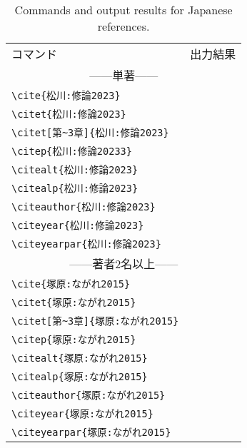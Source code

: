 \documentclass[a4paper,fleqn,uplatex,dvipdfmx]{jsarticle}
\begin{document}
\begin{table}[t]
    \centering
    \caption{Commands and output results for Japanese references.}
    \label{tab:Japanese}
    \begin{tabular}{ll}
        コマンド &出力結果 \\
        \multicolumn{2}{c}{------単著------} \\
        \verb|\cite{松川:修論2023}|            &\cite{松川:修論2023} \\
        \verb|\citet{松川:修論2023}|           &\citet{松川:修論2023} \\
        \verb|\citet[第~3章]{松川:修論2023}|           &\citet[第~3章]{松川:修論2023} \\
        \verb|\citep{松川:修論20233}|           &\citep{松川:修論2023} \\
        \verb|\citealt{松川:修論2023}|         &\citealt{松川:修論2023} \\
        \verb|\citealp{松川:修論2023}|         &\citealp{松川:修論2023} \\
        \verb|\citeauthor{松川:修論2023}|      &\citeauthor{松川:修論2023} \\
        \verb|\citeyear{松川:修論2023}|        &\citeyear{松川:修論2023} \\
        \verb|\citeyearpar{松川:修論2023}|     &\citeyearpar{松川:修論2023} \\
        \multicolumn{2}{c}{------著者2名以上------} \\
        \verb|\cite{塚原:ながれ2015}|            &\cite{塚原:ながれ2015} \\
        \verb|\citet{塚原:ながれ2015}|           &\citet{塚原:ながれ2015} \\
        \verb|\citet[第~3章]{塚原:ながれ2015}|           &\citet[第~3章]{塚原:ながれ2015} \\
        \verb|\citep{塚原:ながれ2015}|           &\citep{塚原:ながれ2015} \\
        \verb|\citealt{塚原:ながれ2015}|         &\citealt{塚原:ながれ2015} \\
        \verb|\citealp{塚原:ながれ2015}|         &\citealp{塚原:ながれ2015} \\
        \verb|\citeauthor{塚原:ながれ2015}|      &\citeauthor{塚原:ながれ2015} \\
        \verb|\citeyear{塚原:ながれ2015}|        &\citeyear{塚原:ながれ2015} \\
        \verb|\citeyearpar{塚原:ながれ2015}|     &\citeyearpar{塚原:ながれ2015} \\

\end{tabular}
\end{table}
\end{document}
